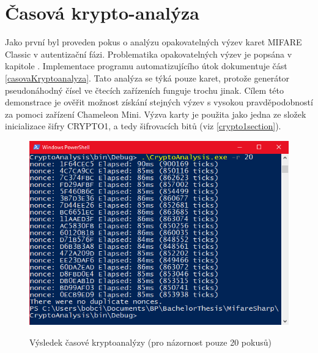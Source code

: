 \section{Časová krypto-analýza}
\label{vyhodnoceniKryptoAnalyza}
Jako první byl proveden pokus o analýzu opakovatelných výzev karet MIFARE Classic v autentizační fázi. Problematika opakovatelných výzev je popsána v kapitole . Implementace programu automatizujícího útok dokumentuje část \ref{casovaKryptoanalyza}. Tato analýza se týká pouze karet, protože generátor pseudonáhodný čísel ve čtecích zařízeních funguje trochu jinak. Cílem této demonstrace je ověřit možnost získání stejných výzev s vysokou pravděpodobností za pomoci zařízení Chameleon Mini. Výzva karty je použita jako jedna ze složek inicializace šifry CRYPTO1, a tedy šifrovacích bitů (viz \ref{crypto1section}). \par

\begin{figure}[ht]\centering
  \centering
  \includegraphics[width=\linewidth]{obrazky-figures/obrazekKryptoanalyza.png}\\[1pt]  
  \caption{Výsledek časové kryptoanalýzy (pro názornost pouze 20 pokusů)}    
  \label{obrazekKryptoanalyza}
\end{figure}


